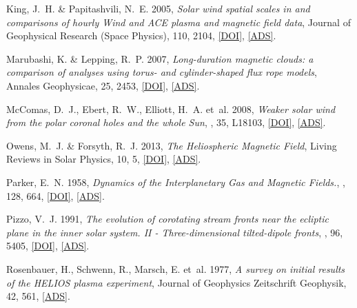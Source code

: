 	{King}, J.~H. \& {Papitashvili}, N.~E. 2005, \emph{{Solar wind spatial scales
	in and comparisons of hourly Wind and ACE plasma and magnetic field data}},
	Journal of Geophysical Research (Space Physics), 110, 2104,
	\href{http://dx.doi.org/10.1029/2004JA010649}{[DOI]},
	\href{http://adsabs.harvard.edu/abs/2005JGRA..110.2104K}{[ADS]}.

	{Marubashi}, K. \& {Lepping}, R.~P. 2007, \emph{{Long-duration magnetic clouds:
	a comparison of analyses using torus- and cylinder-shaped flux rope models}},
	Annales Geophysicae, 25, 2453,
	\href{http://dx.doi.org/10.5194/angeo-25-2453-2007}{[DOI]},
	\href{http://adsabs.harvard.edu/abs/2007AnGeo..25.2453M}{[ADS]}.
	
	{McComas}, D.~J., {Ebert}, R.~W., {Elliott}, H.~A. {et~al.} 2008{},
	\emph{{Weaker solar wind from the polar coronal holes and the whole Sun}},
	\grl, 35, L18103, \href{http://dx.doi.org/10.1029/2008GL034896}{[DOI]},
	\href{http://adsabs.harvard.edu/abs/2008GeoRL..3518103M}{[ADS]}.

	{Owens}, M.~J. \& {Forsyth}, R.~J. 2013, \emph{{The Heliospheric Magnetic
	Field}}, Living Reviews in Solar Physics, 10, 5,
	\href{http://dx.doi.org/10.12942/lrsp-2013-5}{[DOI]},
	\href{http://adsabs.harvard.edu/abs/2013LRSP...10....5O}{[ADS]}.

	{Parker}, E.~N. 1958, \emph{{Dynamics of the Interplanetary Gas and Magnetic Fields.}}, \apj, 128, 664, \href{http://dx.doi.org/10.1086/146579}{[DOI]}, \href{http://adsabs.harvard.edu/abs/1958ApJ...128..664P}{[ADS]}.

	{Pizzo}, V.~J. 1991, \emph{{The evolution of corotating stream fronts near the
	ecliptic plane in the inner solar system. II - Three-dimensional
	tilted-dipole fronts}}, \jgr, 96, 5405,
	\href{http://dx.doi.org/10.1029/91JA00155}{[DOI]},
	\href{http://adsabs.harvard.edu/abs/1991JGR....96.5405P}{[ADS]}.

	{Rosenbauer}, H., {Schwenn}, R., {Marsch}, E. {et~al.} 1977, \emph{{A survey on
	initial results of the HELIOS plasma experiment}}, Journal of Geophysics
	Zeitschrift Geophysik, 42, 561,
	\href{http://adsabs.harvard.edu/abs/1977JGZG...42..561R}{[ADS]}.

